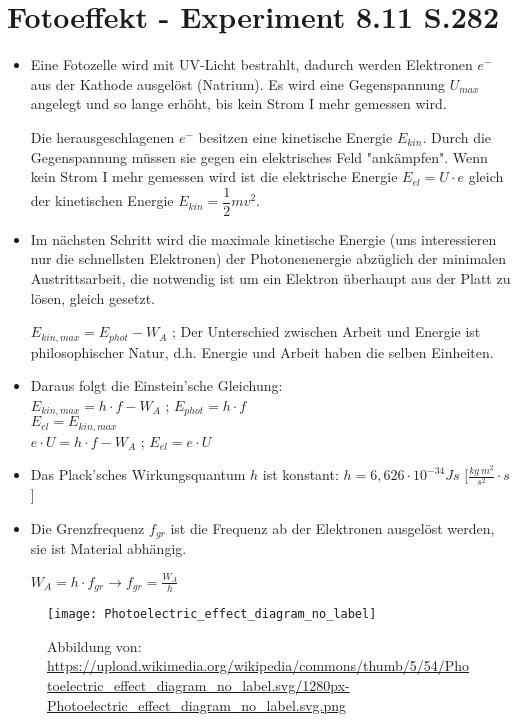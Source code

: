 \section{Fotoeffekt - Experiment 8.11 S.282}
\begin{itemize}
\item Eine Fotozelle wird mit UV-Licht bestrahlt, dadurch werden Elektronen $e^-$ aus der Kathode ausgelöst (Natrium). Es wird eine Gegenspannung $U_{max}$ angelegt und so lange erhöht, bis kein Strom I mehr gemessen wird.

Die herausgeschlagenen $e^-$ besitzen eine kinetische Energie $E_{kin}$. Durch die Gegenspannung müssen sie gegen ein elektrisches Feld "ankämpfen". Wenn kein Strom I mehr gemessen wird ist die elektrische Energie $E_{el} = U \cdot e$ gleich der kinetischen Energie $E_{kin} = \dfrac{1}{2} m v^2$.
\item Im nächsten Schritt wird die maximale kinetische Energie (uns interessieren nur die schnellsten Elektronen) der Photonenenergie abzüglich der minimalen Austrittsarbeit, die notwendig ist um ein Elektron überhaupt aus der Platt zu lösen, gleich gesetzt.

$E_{kin,max} = E_{phot} - W_A$ ; Der Unterschied zwischen Arbeit und Energie ist philosophischer Natur, d.h. Energie und Arbeit haben die selben Einheiten.
\item Daraus folgt die Einstein'sche Gleichung: \\ 
$E_{kin,max} = h \cdot f - W_A$  ; $E_{phot} = h \cdot f$ \\
$E_{el} = E_{kin,max}$ \\
$e \cdot U = h \cdot f - W_A$  ; $E_{el} = e \cdot U$
\item Das Plack'sches Wirkungsquantum $h$ ist konstant: $h = 6,626\cdot10^{-34} Js$ [$\frac{kg \ m^2}{s^2} \cdot s$]
\item Die Grenzfrequenz $f_{gr}$ ist die Frequenz ab der Elektronen ausgelöst werden, sie ist Material abhängig.

$W_A = h \cdot f_{gr} \rightarrow f_{gr} = \frac{W_A}{h}$
\end{itemize}

\begin{figure}[h!]
\centering \texttt{[image: Photoelectric\_effect\_diagram\_no\_label]}
\caption{Abbildung von: \url{https://upload.wikimedia.org/wikipedia/commons/thumb/5/54/Photoelectric\_effect\_diagram\_no\_label.svg/1280px-Photoelectric\_effect\_diagram\_no\_label.svg.png}}
\end{figure}

